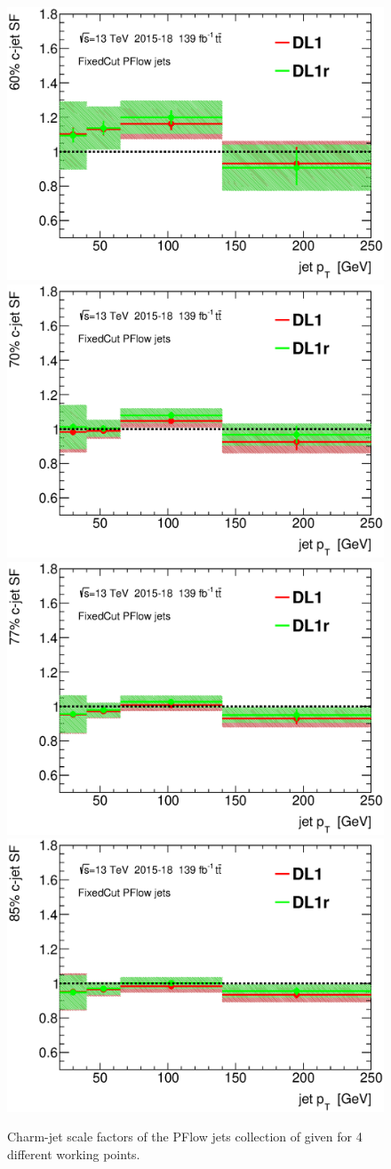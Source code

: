 \documentclass[letterpaper,12pt]{article}
\begin{document}
\begin{figure}[H]
\includegraphics[width=.45\textwidth]{SFplots_december/DL1allPFlowDec_DL1rallPFlowDec/SF60.eps}
\includegraphics[width=.45\textwidth]{SFplots_december/DL1allPFlowDec_DL1rallPFlowDec/SF70.eps}\\
\includegraphics[width=.45\textwidth]{SFplots_december/DL1allPFlowDec_DL1rallPFlowDec/SF77.eps}
\includegraphics[width=.45\textwidth]{SFplots_december/DL1allPFlowDec_DL1rallPFlowDec/SF85.eps}\\
\caption{Charm-jet scale factors of the PFlow jets collection of 
given for 4 different working points.} \label{fig:Dec_SF_PFlow}
\end{figure}
\end{document}
